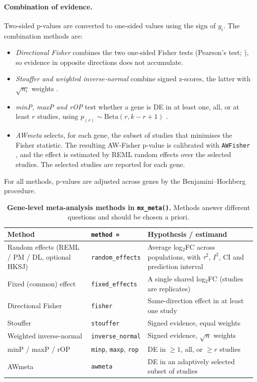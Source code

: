 \documentclass[11pt,a4paper]{article}
\begin{document}
\paragraph{Combination of evidence.} Two-sided p-values are converted to one-sided values using the sign of $y_i$. The combination methods are:
\begin{itemize}[noitemsep,topsep=2pt]
    \item \emph{Directional Fisher} combines the two one-sided Fisher tests (Pearson's test; \cite{owen2009pearson}), so evidence in opposite directions does not accumulate.
    \item \emph{Stouffer and weighted inverse-normal} combine signed z-scores, the latter with $\sqrt{n_i}$ weights \cite{marot2009moderated, rau2014metarnaseq}.
    \item \emph{minP, maxP and rOP} test whether a gene is DE in at least one, all, or at least $r$ studies, using $p_{(r)} \sim \mathrm{Beta}(r, k-r+1)$ \cite{song2014rop}.
    \item \emph{AWmeta} \cite{hu2026awmeta} selects, for each gene, the subset of studies that minimises the Fisher statistic. The resulting AW-Fisher p-value \cite{li2011awfisher} is calibrated with \texttt{AWFisher} \cite{huo2020awfisher}, and the effect is estimated by REML random effects over the selected studies. The selected studies are reported for each gene.
\end{itemize}
For all methods, p-values are adjusted across genes by the Benjamini--Hochberg procedure.

\begin{table}[!htbp]
\centering
\small
\caption{\textbf{Gene-level meta-analysis methods in \texttt{mx\_meta()}.} Methods answer different questions and should be chosen a priori.}
\label{tab:methods}
\begin{tabularx}{\textwidth}{l l >{\raggedright\arraybackslash}X}
\toprule
\textbf{Method} & \textbf{\texttt{method =}} & \textbf{Hypothesis / estimand} \\
\midrule
Random effects (REML / PM / DL, optional HKSJ) & \texttt{random\_effects} & Average log$_2$FC across populations, with $\tau^2$, $I^2$, CI and prediction interval \\
Fixed (common) effect & \texttt{fixed\_effects} & A single shared log$_2$FC (studies are replicates) \\
Directional Fisher & \texttt{fisher} & Same-direction effect in at least one study \\
Stouffer & \texttt{stouffer} & Signed evidence, equal weights \\
Weighted inverse-normal & \texttt{inverse\_normal} & Signed evidence, $\sqrt{n}$ weights \\
minP / maxP / rOP & \texttt{minp}, \texttt{maxp}, \texttt{rop} & DE in $\ge 1$, all, or $\ge r$ studies \\
AWmeta & \texttt{awmeta} & DE in an adaptively selected subset of studies \\
\bottomrule
\end{tabularx}
\end{table}
\end{document}
